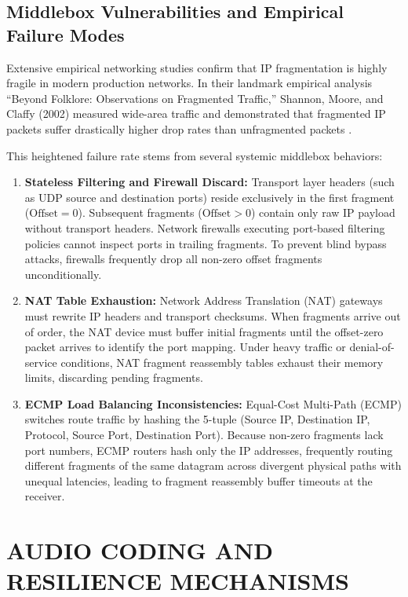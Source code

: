 \subsection{Middlebox Vulnerabilities and Empirical Failure Modes}
Extensive empirical networking studies confirm that IP fragmentation is highly fragile in modern production networks. In their landmark empirical analysis ``Beyond Folklore: Observations on Fragmented Traffic,'' Shannon, Moore, and Claffy (2002) measured wide-area traffic and demonstrated that fragmented IP packets suffer drastically higher drop rates than unfragmented packets \cite{shannon1984ipfrag}.

This heightened failure rate stems from several systemic middlebox behaviors:
\begin{enumerate}
    \item \textbf{Stateless Filtering and Firewall Discard:} Transport layer headers (such as UDP source and destination ports) reside exclusively in the first fragment ($\text{Offset}=0$). Subsequent fragments ($\text{Offset} > 0$) contain only raw IP payload without transport headers. Network firewalls executing port-based filtering policies cannot inspect ports in trailing fragments. To prevent blind bypass attacks, firewalls frequently drop all non-zero offset fragments unconditionally.
    \item \textbf{NAT Table Exhaustion:} Network Address Translation (NAT) gateways must rewrite IP headers and transport checksums. When fragments arrive out of order, the NAT device must buffer initial fragments until the offset-zero packet arrives to identify the port mapping. Under heavy traffic or denial-of-service conditions, NAT fragment reassembly tables exhaust their memory limits, discarding pending fragments.
    \item \textbf{ECMP Load Balancing Inconsistencies:} Equal-Cost Multi-Path (ECMP) switches route traffic by hashing the 5-tuple (Source IP, Destination IP, Protocol, Source Port, Destination Port). Because non-zero fragments lack port numbers, ECMP routers hash only the IP addresses, frequently routing different fragments of the same datagram across divergent physical paths with unequal latencies, leading to fragment reassembly buffer timeouts at the receiver.
\end{enumerate}

\section{AUDIO CODING AND RESILIENCE MECHANISMS}

